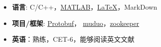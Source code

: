   \begin{itemize}[leftmargin=*]
    \item \textbf{语言}: C/C++，\href{https://www.mathworks.com/}{MATLAB}，\href{https://www.latex-project.org/}{\LaTeX}，MarkDown
    \item \textbf{项目/框架}: \href{https://developers.google.com/protocol-buffers}{Protobuf}，
                             \href{https://github.com/chenshuo/muduo}{muduo}，\href{https://zookeeper.apache.org/}{zookeeper}
    \item \textbf{英语}：熟练，CET-6，能够阅读英文文献
  \end{itemize}